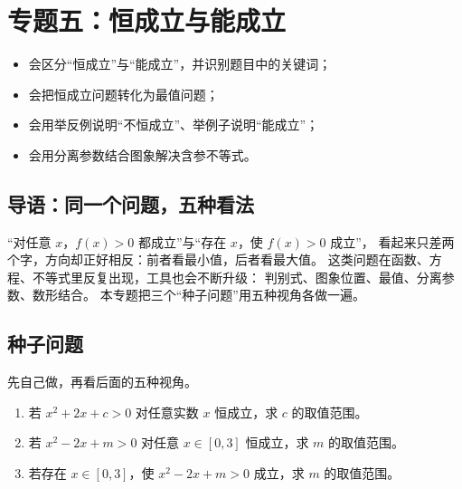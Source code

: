 \section{专题五：恒成立与能成立}

\begin{learnobjective}
\begin{itemize}
  \item 会区分“恒成立”与“能成立”，并识别题目中的关键词；
  \item 会把恒成立问题转化为最值问题；
  \item 会用举反例说明“不恒成立”、举例子说明“能成立”；
  \item 会用分离参数结合图象解决含参不等式。
\end{itemize}
\end{learnobjective}

\begin{preview}
\subsection{导语：同一个问题，五种看法}
“对任意 $x$，$f(x)>0$ 都成立”与“存在 $x$，使 $f(x)>0$ 成立”，
看起来只差两个字，方向却正好相反：前者看最小值，后者看最大值。
这类问题在函数、方程、不等式里反复出现，工具也会不断升级：
判别式、图象位置、最值、分离参数、数形结合。
本专题把三个“种子问题”用五种视角各做一遍。

\subsection{种子问题}
先自己做，再看后面的五种视角。
\begin{enumerate}
  \item 若 $x^2+2x+c>0$ 对任意实数 $x$ 恒成立，求 $c$ 的取值范围。
  \item 若 $x^2-2x+m>0$ 对任意 $x\in[0,3]$ 恒成立，求 $m$ 的取值范围。
  \item 若存在 $x\in[0,3]$，使 $x^2-2x+m>0$ 成立，求 $m$ 的取值范围。
\end{enumerate}
\end{preview}

